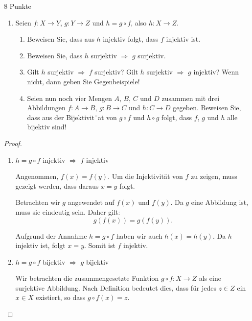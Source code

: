 \documentclass{problemset}
\begin{document}
\pagebreak

\begin{problem}{8 Punkte}
\begin{enumerate}
    \item Seien $f: X \to Y$, $g: Y \to Z$ und $h = g \circ f$, also $h: X \to
          Z$.
          \begin{enumerate}
              \item Beweisen Sie, dass aus $h$ injektiv folgt, dass $f$
                    injektiv ist.
              \item Beweisen Sie, dass $h$ surjektiv $\Rightarrow$ $g$
                    surjektiv.
              \item Gilt $h$ surjektiv $\Rightarrow$ $f$ surjektiv? Gilt $h$
                    surjektiv $\Rightarrow$ $g$ injektiv? Wenn nicht, dann
                    geben Sie Gegenbeispiele!
              \item Seien nun noch vier Mengen $A$, $B$, $C$ und $D$ zusammen
                    mit drei Abbildungen $f: A \to B$, $g: B \to C$ und $h: C
                    \to D$ gegeben. Beweisen Sie, dass aus der Bijektivit¨at
                    von $g \circ f$ und $h \circ g$ folgt, dass $f$, $g$ und
                    $h$ alle bijektiv sind!
          \end{enumerate}

\end{enumerate}

\begin{proof} $ $
    \begin{enumerate}
        \item $h = g \circ f$ injektiv $\Rightarrow$ $f$ injektiv

              Angenommen, $f(x) = f(y)$. Um die Injektivität von $f$ zu zeigen,
              muss gezeigt werden, dass daraus $x = y$ folgt.

              Betrachten wir $g$ angewendet auf $f(x)$ und $f(y)$. Da $g$ eine
              Abbildung ist, muss sie eindeutig sein. Daher gilt:
              \[
                  g(f(x)) = g(f(y)).
              \]

              Aufgrund der Annahme $h = g \circ f$ haben wir auch $h(x) =
              h(y)$. Da $h$ injektiv ist, folgt $x = y$. Somit ist $f$
              injektiv. \checkmark
        \item $h = g \circ f$ bijektiv $\Rightarrow$ $g$ bijektiv

              Wir betrachten die zusammengesetzte Funktion \(g \circ f: X \to
              Z\) als eine surjektive Abbildung. Nach Definition bedeutet dies,
              dass für jedes \(z \in Z\) ein \(x \in X\) existiert, so dass \(g
              \circ f(x) = z\).


\end{enumerate}
\end{proof}
\end{problem}
\end{document}
